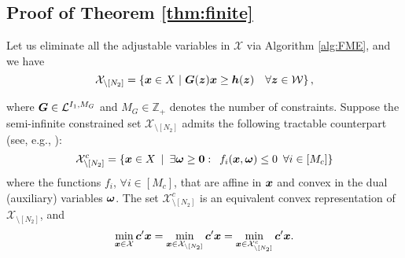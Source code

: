 \documentclass[fleqn,orsc,blindrev]{informs4}
\newcommand{\mb}[1]{\mbox{\boldmath \ensuremath{#1}}}
\begin{document}
\begin{appendices}
	
	
 { \iffalse
	
\section{Proof of Theorem \ref{thm:finite} \label{proof:finitewcs} }
Let us eliminate all the adjustable variables in $\mathcal{X}$ via Algorithm \ref{alg:FME}, and we have 
\begin{equation*}
\mathcal{X}_{\setminus [N_2]} =  \left\{ \mb{x} \in X \hspace{3pt} | \hspace{3pt} \mb{G}(\mb{z}) \mb{x}  \geq\mb{h}(\mb{z})  \quad  \forall \mb{z} \in \mathcal{W} \right\},
\end{equation*}

	where $\mb{G}\in \mathcal{L}^{I_1,M_G}$ and $M_G \in \mathbb{Z}_+$ denotes the number of constraints. Suppose the semi-infinite constrained set $\mathcal{X}_{\setminus [N_2]}$ admits the following tractable counterpart (see, e.g., \cite{bdv15,gbbd14}):
\begin{equation*}
	\mathcal{X}^{c}_{\setminus [N_2]} =\left\{ \mb{x} \in X \enskip | \enskip \exists \mb{\omega} \ge \mb{0}: \enskip f_i(\mb{x}, \mb{\omega}) \le 0 \enskip \forall i\in [M_c] \right\}
\end{equation*}
	where the functions $f_i$, $\forall i\in [M_c]$, that are affine in $\mb{x}$ and convex in the dual (auxiliary) variables $\mb{\omega}$. The set $\mathcal{X}^{c}_{\setminus [N_2]}$ is an equivalent convex representation of $\mathcal{X}_{\setminus [N_2]}$, and
\begin{equation} \label{eq:convexref}
	\min_{\boldsymbol{x} \in \mathcal{X}} \mb{c}'\mb{x} =\min_{\boldsymbol{x} \in \mathcal{X}_{\setminus [N_2]}} \mb{c}'\mb{x} = \min_{\boldsymbol{x} \in \mathcal{X}^{c}_{\setminus [N_2]}} \mb{c}'\mb{x}.
\end{equation}
   
}
\end{appendices}
\end{document}
